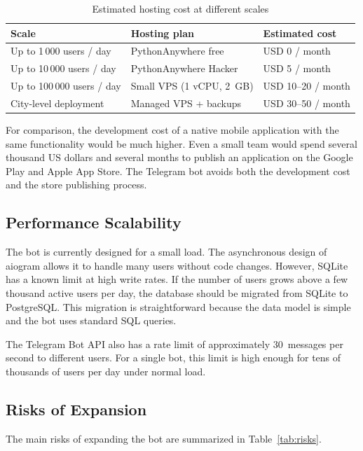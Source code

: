 \begin{table}[h]
\centering
\caption{Estimated hosting cost at different scales}
\label{tab:cost}
\begin{tabular}{lll}
\hline
\textbf{Scale} & \textbf{Hosting plan} & \textbf{Estimated cost} \\
\hline
Up to 1\,000 users / day & PythonAnywhere free & USD 0 / month \\
Up to 10\,000 users / day & PythonAnywhere Hacker & USD 5 / month \\
Up to 100\,000 users / day & Small VPS (1 vCPU, 2~GB) & USD 10--20 / month \\
City-level deployment & Managed VPS + backups & USD 30--50 / month \\
\hline
\end{tabular}
\end{table}

For comparison, the development cost of a native mobile application with
the same functionality would be much higher. Even a small team would
spend several thousand US dollars and several months to publish an
application on the Google Play and Apple App Store. The Telegram bot
avoids both the development cost and the store publishing process.

\subsection{Performance Scalability}
\label{subsec:scalability}

The bot is currently designed for a small load. The asynchronous design
of aiogram allows it to handle many users without code changes. However,
SQLite has a known limit at high write rates. If the number of users
grows above a few thousand active users per day, the database should be
migrated from SQLite to PostgreSQL. This migration is straightforward
because the data model is simple and the bot uses standard SQL queries.\cite{kreibich2010sqlite, sqlite_docs}

The Telegram Bot API also has a rate limit of approximately 30~messages
per second to different users. For a single bot, this limit is high
enough for tens of thousands of users per day under normal load.\cite{telegram_botapi}

\subsection{Risks of Expansion}
\label{subsec:risks}

The main risks of expanding the bot are summarized in
Table~\ref{tab:risks}.

